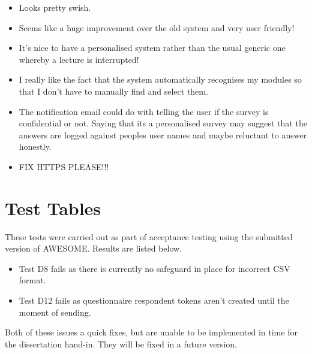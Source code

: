\begin{appendices}
\begin{itemize}
\item Looks pretty swish.
\item Seems like a huge improvement over the old system and very user friendly!
\item It's nice to have a personalised system rather than the usual generic one whereby a lecture is interrupted!
\item I really like the fact that the system automatically recognises my modules so that I don't have to manually find and select them.
\item The notification email could do with telling the user if the survey is confidential or not. Saying that its a personalised survey may suggest that the answers are logged against peoples user names and maybe reluctant to answer honestly.
\item FIX HTTPS PLEASE!!!
	\end{itemize}

	\chapter{Test Tables}
	\label{app:testtables}
	
	These tests were carried out as part of acceptance testing using the submitted version of \ac{AWESOME}.
	Results are listed below.
	
	\begin{itemize}
		\item Test D8 fails as there is currently no safeguard in place for incorrect \ac{CSV} format.
		\item Test D12 fails as questionnaire respondent tokens aren't created until the moment of sending.
	\end{itemize}
	
	Both of these issues a quick fixes, but are unable to be implemented in time for the dissertation hand-in.
	They will be fixed in a future version.

	\begin{sidewaystable}
		

\end{sidewaystable}
\end{appendices}
